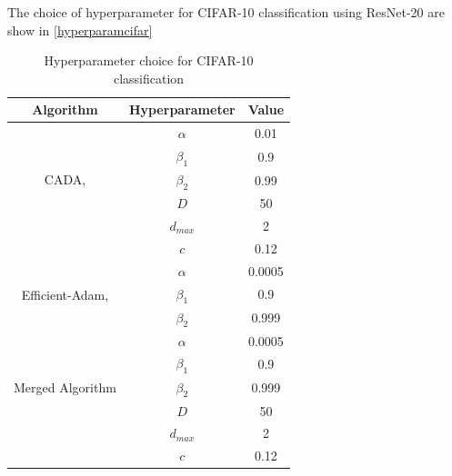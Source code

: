 The choice of hyperparameter for CIFAR-10 classification using ResNet-20 are show in \autoref{hyperparamcifar}
\begin{table}[htbp]
  \caption{Hyperparameter choice for CIFAR-10 classification}\label{hyperparamcifar}
  \centering
  \begin{tabular}{ | c | c | c | }
    \hline
    \textbf{Algorithm}                                        & \textbf{Hyperparameter} & \textbf{Value} \\
    \hline
    \multirow{5}{*}{CADA, \cite{Chen2021CADA}}                & $\alpha$                & 0.01           \\
                                                              & $\beta_1$               & 0.9            \\
                                                              & $\beta_2$               & 0.99           \\
                                                              & $D$                     & 50             \\
                                                              & $d_{max}$               & 2              \\
                                                              & $c$                     & 0.12           \\
    \hline
    \multirow{3}{*}{Efficient-Adam, \cite{Chen2022Efficient}} & $\alpha$                & 0.0005         \\
                                                              & $\beta_1$               & 0.9            \\
                                                              & $\beta_2$               & 0.999          \\
    \hline
    \multirow{5}{*}{Merged Algorithm}                         & $\alpha$                & 0.0005         \\
                                                              & $\beta_1$               & 0.9            \\
                                                              & $\beta_2$               & 0.999          \\
                                                              & $D$                     & 50             \\
                                                              & $d_{max}$               & 2              \\
                                                              & $c$                     & 0.12           \\
    \hline
  \end{tabular}
\end{table}


